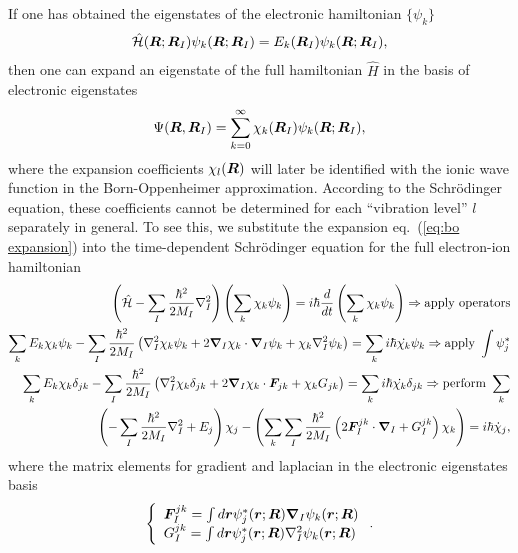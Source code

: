 If one has obtained the eigenstates of the electronic hamiltonian $\{\psi_k\}$
\begin{align}
\hat{\mathcal{H}} (\boldsymbol{R};\boldsymbol{R}_I) \psi_k(\boldsymbol{R};\boldsymbol{R}_I) = E_k(\boldsymbol{R}_I) \psi_k(\boldsymbol{R};\boldsymbol{R}_I),
\end{align}
then one can expand an eigenstate of the full hamiltonian $\hat{H}$ in the basis of electronic eigenstates
\begin{align} \label{eq:bo expansion}
\Psi(\boldsymbol{R},\boldsymbol{R}_I) = \sum_{k=0}^\infty \chi_k(\boldsymbol{R}_I)\psi_k(\boldsymbol{R};\boldsymbol{R}_I), 
\end{align}
where the expansion coefficients $\chi_l(\boldsymbol{R})$ will later be identified with the ionic wave function in the Born-Oppenheimer approximation. According to the Schr\"odinger equation, these coefficients cannot be determined for each ``vibration level'' $l$ separately in general. To see this, we substitute the expansion eq.~(\ref{eq:bo expansion}) into the time-dependent Schr\"odinger equation for the full electron-ion hamiltonian
\begin{align}
\left(\hat{\mathcal{H}} - \sum_I\frac{\hbar^2}{2M_I}\nabla_I^2\right)\left(\sum_k\chi_k\psi_k\right) = i\hbar\frac{d}{dt}\left(\sum_k\chi_k\psi_k\right) \nonumber \Rightarrow \text{apply operators} \\
\sum_k E_k\chi_k\psi_k-\sum_I\frac{\hbar^2}{2M_I}\left(\nabla^2_I\chi_k\psi_k+2\boldsymbol{\nabla}_I\chi_k\cdot\boldsymbol{\nabla}_I\psi_k+\chi_k\nabla_I^2\psi_k\right) = \sum_k i\hbar\dot{\chi_k}\psi_k \nonumber \Rightarrow \text{apply }\int\psi_j^* \\
\sum_k E_k\chi_k\delta_{jk}-\sum_I\frac{\hbar^2}{2M_I}\left(\nabla^2_I\chi_k\delta_{jk}+2\boldsymbol{\nabla}_I\chi_k\cdot\boldsymbol{F}_{jk}+\chi_kG_{jk}\right) = \sum_k i\hbar\dot{\chi_k}\delta_{jk} \nonumber \Rightarrow \text{perform }\sum_k \\
\left(-\sum_I\frac{\hbar^2}{2M_I}\nabla^2_I+E_j\right)\chi_j - \left(\sum_k\sum_I \frac{\hbar^2}{2M_I}\left(2\boldsymbol{F}_I^{jk}\cdot\boldsymbol{\nabla}_I+G_I^{jk}\right)\chi_k\right) = i\hbar\dot{\chi}_j, \label{eq:coupled}
\end{align}
where the matrix elements for gradient and laplacian in the electronic eigenstates basis
\begin{align}
\left\{\begin{array}{l}
\boldsymbol{F}^{jk}_I = \int d\boldsymbol{r} \psi_j^*(\boldsymbol{r};\boldsymbol{R}) \boldsymbol{\nabla}_I\psi_k(\boldsymbol{r};\boldsymbol{R}) \\
G_I^{jk} = \int d\boldsymbol{r} \psi_j^*(\boldsymbol{r};\boldsymbol{R}) \nabla_I^2 \psi_k(\boldsymbol{r};\boldsymbol{R})
\end{array}\right..
\end{align}
